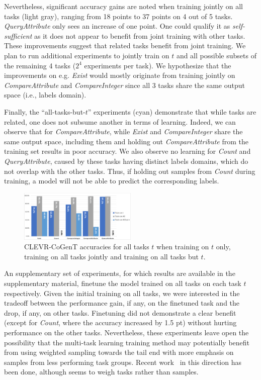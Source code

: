 Nevertheless, significant accuracy gains are noted when training jointly on all tasks (light gray), ranging from 18 points to 37 points on 4 out of 5 tasks. \textit{QueryAttribute} only sees an increase of one point. One could qualify it as \textit{self-sufficient} as it does not appear to benefit from joint training with other tasks. These improvements suggest that related tasks benefit from joint training.
We plan to run additional experiments to jointly train on $t$ and all possible subsets of the remaining 4 tasks ($2^4$ experiments per task). We hypothesize that the improvements on e.g. \textit{Exist} would mostly originate from training jointly on \textit{CompareAttribute} and \textit{CompareInteger} since all 3 tasks share the same output space (i.e., labels domain).

Finally, the ``all-tasks-but-$t$'' experiments (cyan) demonstrate that while tasks are related, one does not subsume another in terms of learning. Indeed, we can observe that for \textit{CompareAttribute}, while \textit{Exist} and \textit{CompareInteger} share the same output space, including them and holding out \textit{CompareAttribute} from the training set results in poor accuracy. We also observe no learning for \textit{Count} and \textit{QueryAttribute}, caused by these tasks having distinct labels domains, which do not overlap with the other tasks. Thus, if holding out samples from \textit{Count} during training, a model will not be able to predict the corresponding labels.

\begin{figure}[!t]
	\centering
	\includegraphics[width=0.5\textwidth]{img/results/CoGenT_results.pdf}
	\caption{CLEVR-CoGenT accuracies for all tasks $t$ when training on $t$ only, training on all tasks jointly and training on all tasks but $t$.} %
	\label{fig:CoGenT-results}
\end{figure}

An supplementary set of experiments, for which results are available in the supplementary material,
finetune the model trained on all tasks on each task $t$ respectively. Given the initial training on all tasks, we were interested in the tradeoff between the performance gain, if any, on the finetuned task and the drop, if any, on other tasks. Finetuning did not demonstrate a clear benefit (except for \textit{Count}, where the accuracy increased by 1.5 pt) without hurting performance on the other tasks. Nevertheless, these experiments leave open the possibility that the multi-task learning training method may potentially benefit from using weighted sampling towards the tail end with more emphasis on samples from less performing task groups. Recent work~\cite{guo2018dynamic, kendall2018multi} in this direction has been done, although seems to weigh tasks rather than samples.

